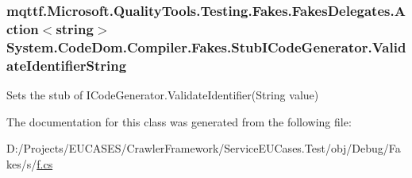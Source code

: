 \hypertarget{class_system_1_1_code_dom_1_1_compiler_1_1_fakes_1_1_stub_i_code_generator_a8ad07b1b9df74cb93dc674100efd4207}{
\subsubsection[{Validate\-Identifier\-String}]{\setlength{\rightskip}{0pt plus 5cm}mqttf.\-Microsoft.\-Quality\-Tools.\-Testing.\-Fakes.\-Fakes\-Delegates.\-Action$<$string$>$ System.\-Code\-Dom.\-Compiler.\-Fakes.\-Stub\-I\-Code\-Generator.\-Validate\-Identifier\-String}}\label{class_system_1_1_code_dom_1_1_compiler_1_1_fakes_1_1_stub_i_code_generator_a8ad07b1b9df74cb93dc674100efd4207}


Sets the stub of I\-Code\-Generator.\-Validate\-Identifier(\-String value)



The documentation for this class was generated from the following file\-:\begin{DoxyCompactItemize}
\item 
D\-:/\-Projects/\-E\-U\-C\-A\-S\-E\-S/\-Crawler\-Framework/\-Service\-E\-U\-Cases.\-Test/obj/\-Debug/\-Fakes/s/\hyperlink{s_2f_8cs}{f.\-cs}\end{DoxyCompactItemize}
